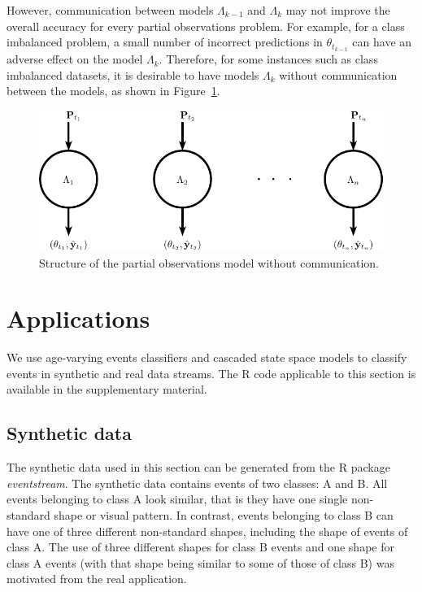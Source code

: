 \documentclass[a4paper,11pt]{article}
\begin{document}
However, communication between models $\Lambda_{k-1}$ and $\Lambda_k$ may not improve the overall accuracy for every partial observations problem. For example, for a class imbalanced problem, a small number of incorrect predictions in $\theta_{t_{k-1}}$ can have an adverse effect on the model $\Lambda_k$. Therefore, for some instances such as class imbalanced datasets, it is desirable to have models $\Lambda_k$ without communication between the models, as shown in Figure~\ref{fig:PODLM2}.

\begin{figure}[!hb]
	\centering
	\includegraphics[clip=true,scale=0.8]{./Graphics/Lots_of_circles_4.pdf}
	\caption{Structure of the partial observations model without communication.}
	\label{fig:PODLM2}
\end{figure}

\section{Applications}\label{sec:Experiments}

We use age-varying events classifiers and cascaded state space models to classify events in synthetic and real data streams. The R code applicable to this section is available in the supplementary material.

\subsection{Synthetic data}\label{subsec:Synthetic}

The synthetic data used in this section can be generated from the R package \textit{eventstream}. The synthetic data contains events of two classes: A and B. All events belonging to class A look similar, that is they have one single non-standard shape or visual pattern. In contrast, events belonging to class B can have one of three different non-standard shapes, including the shape of events of class A. The use of three different shapes for class B events and one shape for class A events (with that shape being similar to some of those of class B) was motivated from the real application.
\end{document}
